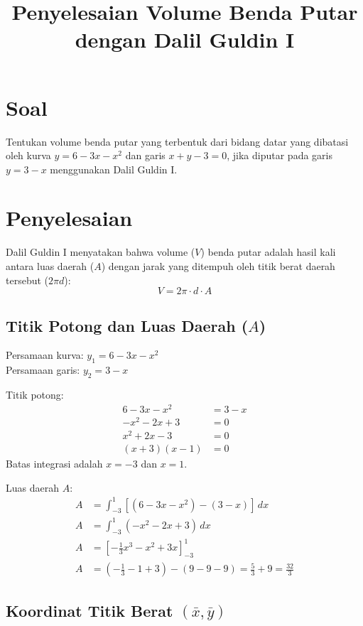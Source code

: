 \documentclass[12pt,a4paper]{article}
\title{Penyelesaian Volume Benda Putar dengan Dalil Guldin I}
\author{}
\date{}
\begin{document}
\maketitle

\section{Soal}
Tentukan volume benda putar yang terbentuk dari bidang datar yang dibatasi oleh kurva $y = 6 - 3x - x^2$ dan garis $x + y - 3 = 0$, jika diputar pada garis $y = 3 - x$ menggunakan Dalil Guldin I.

\section{Penyelesaian}

Dalil Guldin I menyatakan bahwa volume ($V$) benda putar adalah hasil kali antara luas daerah ($A$) dengan jarak yang ditempuh oleh titik berat daerah tersebut ($2\pi d$):
\begin{equation}
  V = 2\pi \cdot d \cdot A
\end{equation}

\subsection{Titik Potong dan Luas Daerah ($A$)}
Persamaan kurva: $y_1 = 6 - 3x - x^2$ \\
Persamaan garis: $y_2 = 3 - x$

Titik potong:
\begin{align*}
  6 - 3x - x^2 &= 3 - x \\
  -x^2 - 2x + 3 &= 0 \\
  x^2 + 2x - 3 &= 0 \\
  (x + 3)(x - 1) &= 0
\end{align*}
Batas integrasi adalah $x = -3$ dan $x = 1$.

Luas daerah $A$:
\begin{align*}
  A &= \int_{-3}^{1} [(6 - 3x - x^2) - (3 - x)] \, dx \\
  A &= \int_{-3}^{1} (-x^2 - 2x + 3) \, dx \\
  A &= \left[ -\frac{1}{3}x^3 - x^2 + 3x \right]_{-3}^{1} \\
  A &= \left( -\frac{1}{3} - 1 + 3 \right) - (9 - 9 - 9) = \frac{5}{3} + 9 = \frac{32}{3}
\end{align*}

\subsection{Koordinat Titik Berat $(\bar{x}, \bar{y})$}
\end{document}
